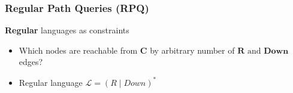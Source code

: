 \documentclass[xcolor=table,aspectratio=169]{beamer}
\begin{document}
\begin{frame}[fragile] \frametitle{Regular Path Queries (RPQ)}
      \begin{minipage}[m]{0.45\linewidth}
  \end{minipage}\hfill
  \begin{minipage}[m]{0.5\linewidth}
  \textbf{Regular} languages as constraints

  \vfill


  \begin{itemize}
        \item Which nodes are reachable from \textbf{C} by arbitrary number of $\textbf{R} \text{ and } \textbf{Down}$ edges?
        \item Regular language $\mathcal{L} = (\textit{R} \mid \textit{Down})^*$
  \end{itemize}

  \end{minipage}

\end{frame}
\end{document}
